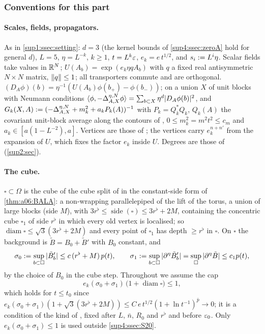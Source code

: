 \subsubsection*{Conventions for this part}

\paragraph{Scales, fields, propagators.} As in \cref{sup1:ssec:setting}: $d=3$ (the kernel bounds of \cref{sup4:ssec:zeroA} hold for general $d$), $L=5$, $\eta=L^{-k}$, $k\ge1$, $t=L^k\varepsilon$, $e_k=e\,t^{1/2}$, and $s_i:= L^i\eta$. Scalar fields take values in $\mathbb R^N$; $U(A_b)=\exp(e_k\eta qA_b)$ with $q$ a fixed real antisymmetric $N\times N$ matrix, $\lVert q\rVert\le1$; all transporters commute and are orthogonal. $(D_A\phi)(b)=\eta^{-1}(U(A_b)\phi(b_+)-\phi(b_-))$; on a union $X$ of unit blocks with Neumann conditions $\langle \phi,-\Delta^{\eta,N}_{A,X}\phi\rangle=\sum_{b\subset X}\eta^d|D_A\phi(b)|^2$, and $G_k(X,A):=(-\Delta^{\eta,N}_{A,X}+m_k^2+a_kP_k(A))^{-1}$ with $P_k=Q_k^*Q_k$, $Q_k(A)$ the covariant unit-block average along the contours of \cite[(2.1)--(2.2)]{Ba1}, $0\le m_k^2=m^2t^2\le c_m$ and $a_k\in[a(1-L^{-2}),a]$. Vertices are those of \cite[(1.6)--(1.15)]{Ba3}; the vertices \cite[(1.8)--(1.11)]{Ba3} carry $e_k^{n+n'}$ from the expansion of $U$, which fixes the factor $e_k$ inside $U$. Degrees are those of \cite[(2.1)--(2.3)]{Ba3} (\cref{sup2:sec}).

\paragraph{The cube.} $\square\subset\Omega$ is the cube of the cube split of \cite[p.~433]{Ba3} in the constant-side form of \cref{thm:a06:BALA}: a non-wrapping parallelepiped of the lift of the torus, a union of large blocks (side $M$), with $3r^\flat\le\operatorname{side}(\square)\le3r^\flat+2M$, containing the concentric cube $\square_1$ of side $r^\flat$ in which every old vertex is localised; so $\operatorname{diam}\square\le\sqrt3(3r^\flat+2M)$ and every point of $\square_1$ has depth $\ge r^\flat$ in $\square$. On $\square$ the background is $\tilde B=B_0+\tilde B'$ with $B_0$ constant, and
\[
\sigma_0:=\sup_{b\subset\square}|\tilde B'_b|\le c\,(r^\flat+M)\,p(t),\qquad \sigma_1:=\sup_{b\subset\square}|\partial^\eta\tilde B'_b|=\sup_\square|\partial^\eta\tilde B|\le c_1p(t),
\]
by the choice of $B_0$ in the cube step. Throughout we assume the cap
\begin{equation}\label{sup4:eq:cap}
e_k(\sigma_0+\sigma_1)\,\big(1+\operatorname{diam}\square\big)\le1,\tag{cap}
\end{equation}
which holds for $t\le t_0$ since $e_k(\sigma_0+\sigma_1)(1+\sqrt3(3r^\flat+2M))\le C\,e\,t^{1/2}(1+\ln t^{-1})^{\bar p}\to0$; it is a condition of the kind of \cite[p.~412]{Ba3}, fixed after $L$, $\bar n$, $R_0$ and $r^\flat$ and before $\varepsilon_0$. Only $e_k(\sigma_0+\sigma_1)\le1$ is used outside \cref{sup4:ssec:S20}.

